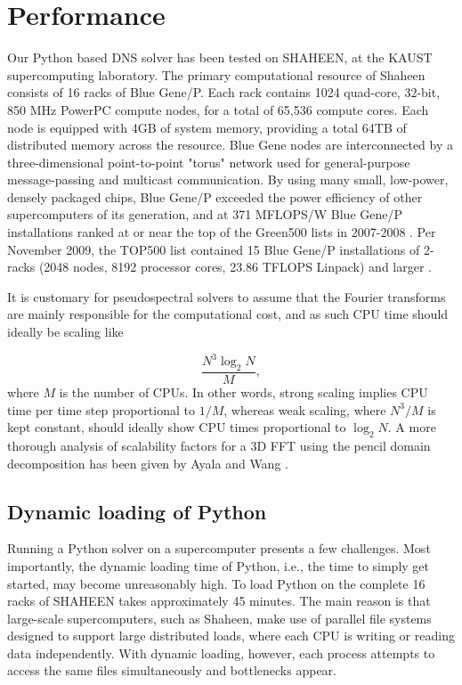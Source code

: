 \documentclass[11pt, oneside]{article}
\begin{document}
\section{Performance}
Our Python based DNS solver has been tested on SHAHEEN, at the KAUST supercomputing laboratory. The primary computational resource of Shaheen consists of 16 racks of Blue Gene/P. Each rack contains 1024 quad-core, 32-bit, 850 MHz PowerPC compute nodes, for a total of 65,536 compute cores. Each node is equipped with 4GB of system memory, providing a total 64TB of distributed memory across the resource. Blue Gene nodes are interconnected by a three-dimensional point-to-point "torus" network used for general-purpose message-passing and multicast communication. By using many small, low-power, densely packaged chips, Blue Gene/P exceeded the power efficiency of other supercomputers of its generation, and at 371 MFLOPS/W Blue Gene/P installations ranked at or near the top of the Green500 lists in 2007-2008 \cite{top500green}.  Per November 2009, the TOP500 list contained 15 Blue Gene/P installations of 2-racks (2048 nodes, 8192 processor cores, 23.86 TFLOPS Linpack) and larger \cite{top500}.

It is customary for pseudospectral solvers to assume that the Fourier transforms are mainly responsible for the computational cost, and as such CPU time should ideally be scaling like

\begin{equation}
 \frac{N^3 \log_2 N}{M},
\end{equation}
where $M$ is the number of CPUs. In other words, strong scaling implies CPU time per time step proportional to $1/M$, whereas weak scaling, where $N^3/M$ is kept constant, should ideally show CPU times proportional to $\log_2 N$. A more thorough analysis of scalability factors for a 3D FFT using the pencil domain decomposition has been given by Ayala and Wang \cite{ayala2013}.

\subsection{Dynamic loading of Python}
Running a Python solver on a supercomputer presents a few challenges. Most importantly, the dynamic loading time of Python, i.e., the time to simply get started, may become unreasonably high. To load Python on the complete 16 racks of SHAHEEN takes approximately 45 minutes. The main reason is that large-scale supercomputers, such as Shaheen, make use of parallel file systems designed to support large distributed loads, where each CPU is writing or reading data independently. With dynamic loading, however, each process attempts to access the same files simultaneously and bottlenecks appear. 
\end{document}
